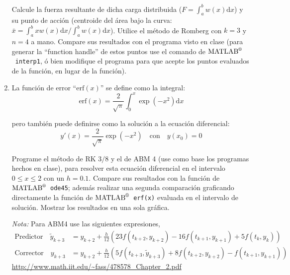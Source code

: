 \documentclass[letterpaper,12pt]{exam}
\newcommand{\matlab}{$\text{MATLAB}^{\text{\textregistered}}$~}
\begin{document}
\begin{enumerate}
 Calcule la fuerza resultante de dicha carga distribuida ($F = \int_{a}^{b} w(x)\mathrm{d}x$) y su punto de acción (centroide del área bajo la curva: $\bar{x}=\int_{a}^{b} x w(x)\mathrm{d}x/\int_{a}^{b} w(x)\mathrm{d}x$). Utilice el método de Romberg con $k=3$ y $n=4$ a mano. Compare sus resultados con el programa visto en clase (para generar la ``function handle'' de estos puntos use el comando de \matlab \texttt{interp1}, ó bien modifique el programa para que acepte los puntos evaluados de la función, en lugar de la función).


\item La función de error ``$\text{erf}(x)$'' se define como la integral:
 \begin{equation}
  \text{erf}(x) = \frac{2}{\sqrt{\pi}} \int_{0}^{x} \exp\left(-x^2\right) \mathrm{d} x
 \end{equation}

 pero también puede definirse como la solución a la ecuación diferencial:
 \begin{equation}
  y'(x) = \frac{2}{\sqrt{\pi}} \exp\left(-x^2\right) \quad \text{con} \quad y(x_0) = 0
 \end{equation}

 Programe el método de RK $3/8$ y el de ABM 4 (use como base los programas hechos en clase), para resolver esta ecuación diferencial en el intervalo $0\leq x \leq 2$ con un $h=0.1$. Compare sus resultados con la función de \matlab \texttt{ode45}; además realizar una segunda comparación graficando directamente la función de \matlab \texttt{erf(x)} evaluada en el intervalo de solución. Mostrar los resultados en una sola gráfica. 
 
 \emph{Nota:} Para ABM4 use las siguientes expresiones,
 \begin{align}
  \text{Predictor}\quad \tilde{y}_{k+3} &= y_{k+2} + \frac{h}{12}\left(23f(t_{k+2},y_{k+2}) - 16f(t_{k+1},y_{k+1}) + 5f(t_{k},y_{k})\right) \\
  \text{Corrector}\quad y_{k+3} &= y_{k+2} + \frac{h}{12}\left(5f(t_{k+3},\tilde{y}_{k+3}) + 8f(t_{k+2},y_{k+2}) - f(t_{k+1},y_{k+1})\right) 
 \end{align}
 \url{http://www.math.iit.edu/~fass/478578_Chapter_2.pdf}

\end{enumerate}
\end{document}

